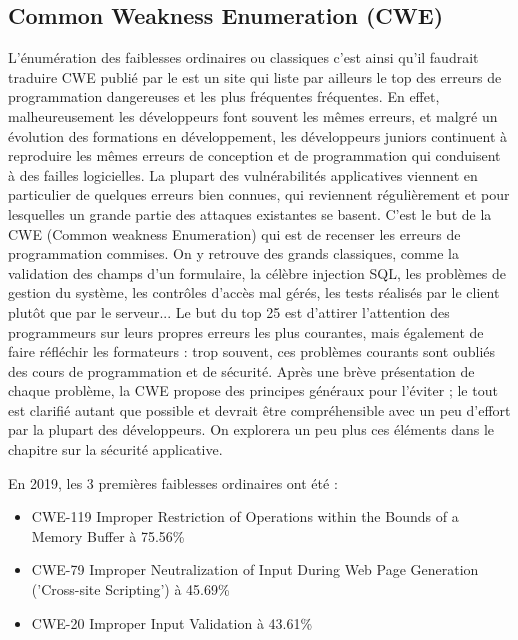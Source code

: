 \subsection{Common Weakness Enumeration (CWE)}

 L'énumération des faiblesses ordinaires ou classiques c'est ainsi qu'il faudrait traduire CWE publié par le   est un site qui liste par ailleurs le top des  erreurs de programmation dangereuses et les plus fréquentes fréquentes. En effet, malheureusement les  développeurs font souvent les mêmes erreurs, et malgré un évolution des formations en développement, les développeurs juniors continuent à reproduire les mêmes erreurs de conception et de programmation qui conduisent à des failles logicielles.
La plupart des vulnérabilités applicatives viennent en particulier de quelques erreurs bien connues, qui reviennent régulièrement et pour lesquelles un grande partie des attaques existantes se basent.
C'est le but de la CWE (Common weakness Enumeration) qui est de recenser les erreurs de programmation commises. 
On y retrouve des grands classiques, comme la validation des champs d'un formulaire, la célèbre injection SQL, les problèmes de gestion du système, les contrôles d'accès mal gérés, les tests réalisés par le client plutôt que par le serveur...
Le but du top 25 est d'attirer l'attention des programmeurs sur leurs propres erreurs les plus courantes, mais également de faire réfléchir les formateurs : trop souvent, ces problèmes courants sont oubliés des cours de programmation et de sécurité. Après une brève présentation de chaque problème, la CWE propose des principes généraux pour l'éviter ; le tout est clarifié autant que possible et devrait être compréhensible avec un peu d'effort par la plupart des développeurs. On explorera un peu plus ces éléments dans le chapitre sur la sécurité applicative.

En 2019, les 3 premières faiblesses ordinaires ont été : 

\begin{itemize}
  \item CWE-119	Improper Restriction of Operations within the Bounds of a Memory Buffer	à 75.56\%
  \item CWE-79	Improper Neutralization of Input During Web Page Generation ('Cross-site Scripting')	à 45.69\%
  \item CWE-20	Improper Input Validation à 43.61\%
\end{itemize}




